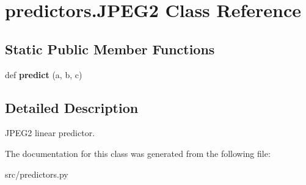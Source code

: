 \hypertarget{classpredictors_1_1JPEG2}{}\section{predictors.\+J\+P\+E\+G2 Class Reference}
\label{classpredictors_1_1JPEG2}
\subsection*{Static Public Member Functions}
\begin{DoxyCompactItemize}
\item 
\mbox{\label{classpredictors_1_1JPEG2_a31a0d80b491cac6662eb8c214a2c0ac3}} 
def {\bfseries predict} (a, b, c)
\end{DoxyCompactItemize}


\subsection{Detailed Description}
\begin{DoxyVerb}JPEG2 linear predictor.
\end{DoxyVerb}
 

The documentation for this class was generated from the following file\+:\begin{DoxyCompactItemize}
\item 
src/predictors.\+py\end{DoxyCompactItemize}
